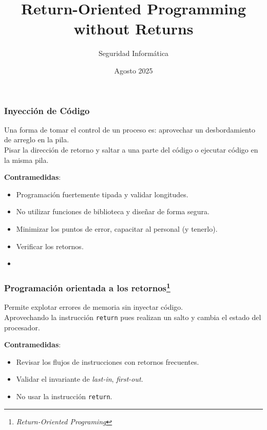 \documentclass{beamer}
\title[ROP without Returns] %
{Return-Oriented Programming without Returns}
\subtitle{
}
\author[] %
{
    Seguridad Informática 
}
\institute[LCC - FCEIA] %
{
    Facultad de Ciencias Exactas, Ingeniería y Agrimensura\\Universidad Nacional de Rosario
}
\date[Seguridad Informática] %
{Agosto 2025}
\newcommand { \return } {\texttt{return}\xspace}
\begin{document}
\frame{
    \titlepage
}

\begin{frame}
    \frametitle{Inyección de Código}
    Una forma de tomar el control de un proceso es: aprovechar un desbordamiento de arreglo en la pila.\\
    
    Pisar la dirección de retorno y saltar a una parte del código o ejecutar código en la misma pila.\\

    \pause

    \textbf{Contramedidas}:
    \begin{itemize}
        \item<2-> Programación fuertemente tipada y validar longitudes.
        \item<2-> No utilizar funciones de biblioteca y diseñar de forma segura.
        \item<2-> Minimizar los puntos de error, capacitar al personal (y tenerlo).
        \item<2-> Verificar los retornos.
        \item<2->  
    \end{itemize}
\end{frame}

\begin{frame}
    \frametitle{Programación orientada a los retornos\footnote{\textit{Return-Oriented Programing}}}
    Permite explotar errores de memoria sin inyectar código. \\
    
    Aprovechando la instrucción \return pues realizan un salto y cambia el estado del procesador.\\
    
    \pause
    
    \textbf{Contramedidas}:
    \begin{itemize}
        \item<2-> Revisar los flujos de instrucciones con retornos frecuentes. 
        \item<2-> Validar el invariante de \textit{last-in}, \textit{first-out}.
        \item<2-> No usar la instrucción \return.
    \end{itemize}
\end{frame}
\end{document}
